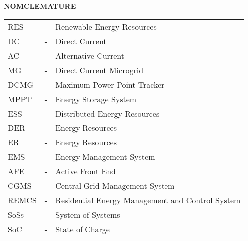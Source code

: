 	\textbf{NOMCLEMATURE}

	\begin{table}[!ht]
		{\setlength{\extrarowheight}{20pt}}
		\begin{tabular}{ p{2cm} p{1cm} p{6cm} }
		RES		&-&Renewable Energy Resources\\
		DC		&-&Direct Current\\
		AC		&-&Alternative Current\\
		MG		&-&Direct Current Microgrid\\
		DCMG	&-&Maximum Power Point Tracker\\
		MPPT	&-&Energy Storage System\\
		ESS		&-&Distributed Energy Resources\\
		DER		&-&Energy Resources\\
		ER		&-&Energy Resources\\
		EMS		&-&Energy Management System\\
		AFE		&-&Active Front End\\
		CGMS	&-&Central Grid Management System\\
		REMCS	&-&Residential Energy Management and Control System\\
		SoSs	&-&System of Systems\\
		SoC		&-&State of Charge\\		
		\end{tabular}
	\end{table}






